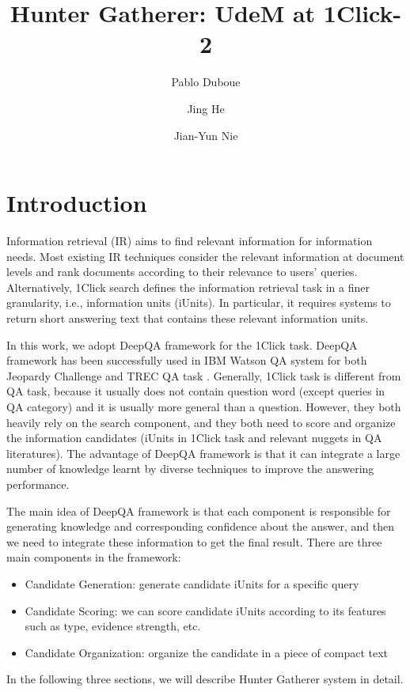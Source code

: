 \documentclass{llncs}
\begin{document}
\title{Hunter Gatherer: UdeM at 1Click-2}
\author{Pablo Duboue \and Jing He  \and Jian-Yun Nie}



\maketitle




\section{Introduction}
Information retrieval (IR) aims to find relevant information for information needs.
Most existing IR techniques consider the relevant information at document levels and rank documents according to their relevance to users' queries.
Alternatively, 1Click search defines the information retrieval task in a finer granularity, i.e., information units (iUnits).
In particular, it requires systems to return short answering text that contains these relevant information units.

In this work, we adopt DeepQA framework for the 1Click task.
DeepQA framework has been successfully used in IBM Watson QA system for both Jeopardy Challenge and TREC QA task \cite{ferrucci_etal_AI10}.
Generally, 1Click task is different from QA task, because it usually does not contain question word (except queries in QA category) and it is usually more general than a question.
However, they both heavily rely on the search component, and they both need to score and organize the information candidates (iUnits in 1Click task and relevant nuggets in QA literatures).
The advantage of DeepQA framework is that it can integrate a large number of knowledge learnt by diverse techniques to improve the answering performance.

The main idea of DeepQA framework is that each component is responsible for generating knowledge and corresponding confidence about the answer, and then we need to integrate these information to get the final result.
There are three main components in the framework:
\begin{itemize}
\item Candidate Generation: generate candidate iUnits for a specific query
\item Candidate Scoring: we can score candidate iUnits according to its features such as type, evidence strength, etc.
\item Candidate Organization: organize the candidate in a piece of compact text
\end{itemize}
In the following three sections, we will describe Hunter Gatherer system in detail.
\end{document}
